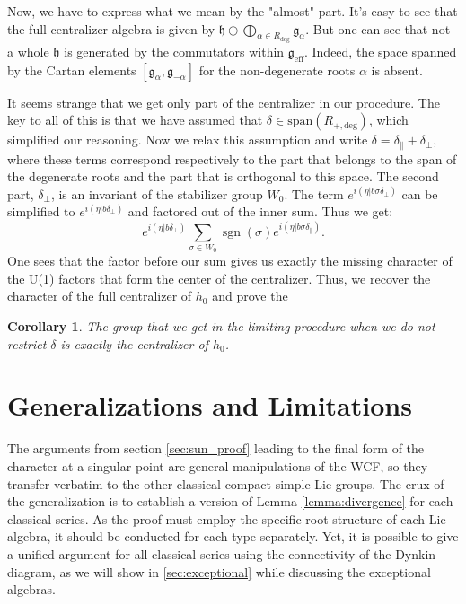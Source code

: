 \documentclass[11pt, a4paper]{article}
\DeclareMathOperator{\sgn}{sgn}
\newtheorem{corollary}[theorem]{Corollary}
\theoremstyle{definition}
\theoremstyle{remark}
\begin{document}
Now, we have to express what we mean by the "almost" part. It's easy to see that the full centralizer algebra is given by $\mathfrak{h} \oplus \bigoplus_{\alpha \in R_{\text{deg}}} \mathfrak{g}_\alpha$. But one can see that not a whole $\mathfrak{h}$ is generated by the commutators within $\mathfrak{g}_{\text{eff}}$. Indeed, the space spanned by the Cartan elements $[\mathfrak{g}_{\alpha},\mathfrak{g}_{-\alpha}] $ for the non-degenerate roots $\alpha$ is absent.

It seems strange that we get only part of the centralizer in our procedure. The key to all of this is that we have assumed that $\delta \in \mathrm{span}(R_{+, \text{deg}})$, which simplified our reasoning. Now we relax this assumption and write $\delta = \delta_\parallel + \delta_\perp$, where these terms correspond respectively to the part that belongs to the span of the degenerate roots and the part that is orthogonal to this space. The second part, $\delta_\perp$, is an invariant of the stabilizer group $W_0$. The term $e^{i(\eta|b\sigma\delta_\perp)}$ can be simplified to $e^{i(\eta|b \delta_\perp)}$ and factored out of the inner sum. Thus we get:
\begin{equation}
    e^{i(\eta|b\delta_\perp)} \sum_{\sigma \in W_0} \sgn(\sigma) e^{i(\eta|b\sigma\delta_\parallel)}.
\end{equation}
One sees that the factor before our sum gives us exactly the missing character of the U(1) factors that form the center of the centralizer. Thus, we recover the character of the full centralizer of $h_0$ and prove the


\begin{corollary}
    The group that we get in the limiting procedure when we do not restrict $\delta$ is exactly the centralizer of $h_0$.
\end{corollary}

\section{Generalizations and Limitations}
\label{sec:generalization}

The arguments from section \ref{sec:sun_proof} leading to the final form of the character at a singular point are general manipulations of the WCF, so they transfer verbatim to the other classical compact simple Lie groups. The crux of the generalization is to establish a version of Lemma \ref{lemma:divergence} for each classical series. As the proof must employ the specific root structure of each Lie algebra, it should be conducted for each type separately. Yet, it is possible to give a unified argument for all classical series using the connectivity of the Dynkin diagram, as we will show in \ref{sec:exceptional} while discussing the exceptional algebras.
\end{document}
